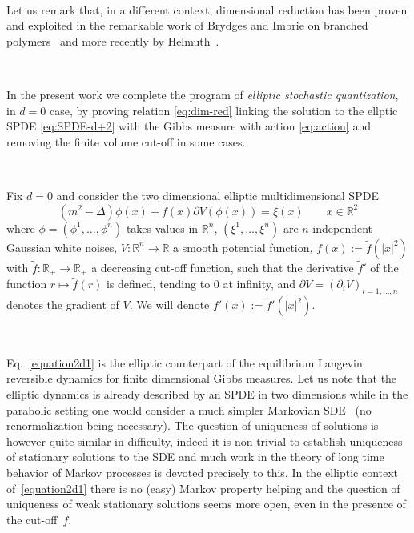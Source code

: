 \documentclass[a4paper,10pt]{article}
\newcommand{\assign}{:=}
\newcommand{\tmtextit}[1]{{\itshape{#1}}}
\begin{document}
\

Let us remark that, in a different context, dimensional reduction has been
proven and exploited in the remarkable work of Brydges and Imbrie on branched
polymers~{\cite{brydges_branched_2003,brydges_dimensional_2003}} and more
recently by Helmuth~{\cite{helmuth_dimensional_2016}}.

\

In the present work we complete the program of \tmtextit{elliptic stochastic
quantization}, in $d = 0$ case, by proving relation {\eqref{eq:dim-red}}
linking the solution to the ellptic SPDE {\eqref{eq:SPDE-d+2}} with the Gibbs
measure with action {\eqref{eq:action}} and removing the finite volume cut-off
in some cases.

\

Fix $d = 0$ and consider the two dimensional elliptic multidimensional SPDE
\begin{equation}
  (m^2 - \Delta) \phi (x) + f (x) \partial V (\phi (x)) = \xi (x)
  \label{equation2d1} \qquad x \in \mathbb{R}^2
\end{equation}
where $\phi = (\phi^1, \ldots, \phi^n)$ takes values in $\mathbb{R}^n$,
$(\xi^1, \ldots, \xi^n)$ are $n$ independent Gaussian white noises, $V :
\mathbb{R}^n \rightarrow \mathbb{R}$ a smooth potential function, $f (x)
\assign \tilde{f} (| x |^2)$ with $\tilde{f} : \mathbb{R}_+ \rightarrow
\mathbb{R}_+$ a decreasing cut-off function, such that the derivative
$\tilde{f}'$ of the function $r \longmapsto \tilde{f} (r)$ is defined, tending
to $0$ at infinity, and $\partial V = (\partial_i V)_{i = 1, \ldots, n}$
denotes the gradient of $V$. We will denote $f' (x) \assign \tilde{f}' (| x
|^2)$.

\

Eq.~{\eqref{equation2d1}} is the elliptic counterpart of the equilibrium
Langevin reversible dynamics for finite dimensional Gibbs measures. Let us
note that the elliptic dynamics is already described by an SPDE in two
dimensions while in the parabolic setting one would consider a much simpler
Markovian SDE~{\cite{iwata_infinite_1987,albeverio_strong_2012}} (no
renormalization being necessary). The question of uniqueness of solutions is
however quite similar in difficulty, indeed it is non-trivial to establish
uniqueness of stationary solutions to the SDE and much work in the theory of
long time behavior of Markov processes is devoted precisely to this. In the
elliptic context of~{\eqref{equation2d1}} there is no (easy) Markov property
helping and the question of uniqueness of weak stationary solutions seems more
open, even in the presence of the cut-off~$f$.
\end{document}
